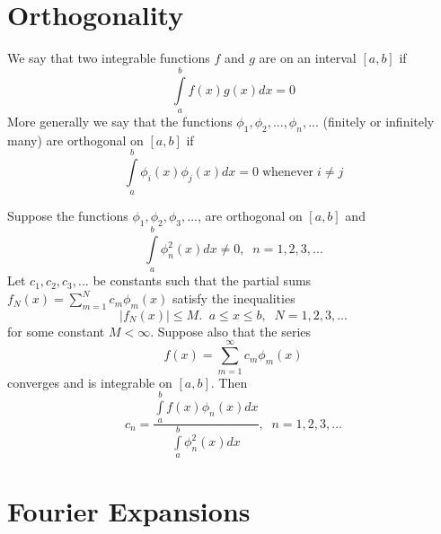 \documentclass[12pt, a4paper, oneside, openright, titlepage]{book}
\begin{document}
\section{Orthogonality}

\begin{defn}[Orthogonal]
        We say that two integrable functions $f$ and $g$ are  on an interval $[a,b]$ if \begin{equation}
                \int\limits_a^bf(x)g(x)dx = 0
        \end{equation}
        More generally we say that the functions $\phi_1,\phi_2,...,\phi_n,...$ (finitely or infinitely many) are orthogonal on $[a,b]$ if \begin{equation}
                \int\limits_a^b\phi_i(x)\phi_j(x)dx = 0\;\text{whenever}\;i\neq j
        \end{equation}
\end{defn}




\begin{thm}
        Suppose the functions $\phi_1,\phi_2,\phi_3,...$, are orthogonal on $[a,b]$ and \begin{equation}
                \int\limits_a^b\phi_n^2(x)dx \neq 0,\;\;n=1,2,3,...
        \end{equation}
        Let $c_1,c_2,c_3,...$ be constants such that the partial sums $f_N(x) = \sum_{m=1}^Nc_m\phi_m(x)$ satisfy the inequalities \begin{equation}
                |f_N(x)| \leq M.\;\;a \leq x \leq b,\;\;N=1,2,3,...
        \end{equation}
        for some constant $M < \infty$. Suppose also that the series \begin{equation}
                f(x) = \sum\limits_{m=1}^{\infty}c_m\phi_m(x)
        \end{equation}
        converges and is integrable on $[a,b]$. Then \begin{equation}
                c_n = \frac{\int\limits_a^bf(x)\phi_n(x)dx}{\int\limits_a^b\phi_n^2(x)dx},\;\;n=1,2,3,...
        \end{equation}
\end{thm}




\section{Fourier Expansions}
\end{document}
